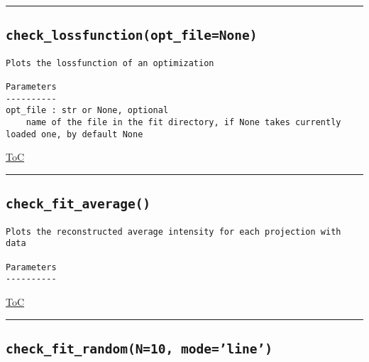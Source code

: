 \documentclass{article}
\begin{document}


\vspace{5mm}

\hrule

\subsection*{\texttt{check\_lossfunction(opt\_file=None)}}
\label{fun:checklossfunction}

\begin{lstlisting}[language=docstring]
Plots the lossfunction of an optimization

Parameters
----------
opt_file : str or None, optional
    name of the file in the fit directory, if None takes currently loaded one, by default None
\end{lstlisting}

\begin{flushright}

\hyperref[toc]{ToC}

\end{flushright}



\vspace{5mm}

\hrule

\subsection*{\texttt{check\_fit\_average()}}
\label{fun:checkfitaverage}

\begin{lstlisting}[language=docstring]
Plots the reconstructed average intensity for each projection with data

Parameters
----------
\end{lstlisting}

\begin{flushright}

\hyperref[toc]{ToC}

\end{flushright}



\vspace{5mm}

\hrule

\subsection*{\texttt{check\_fit\_random(N=10, mode='line')}}
\label{fun:checkfitrandom}
\end{document}
